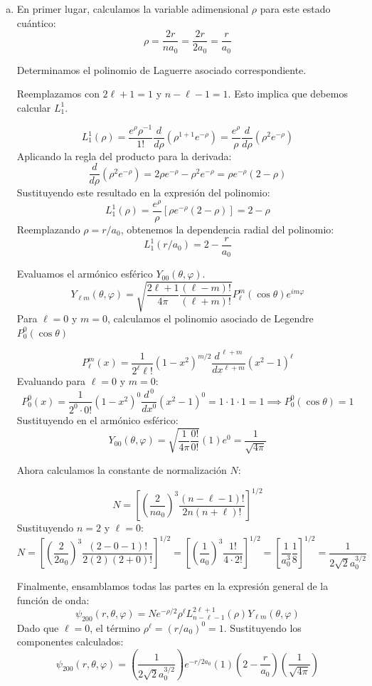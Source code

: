 \documentclass[a4paper]{article}
\begin{document}
\begin{enumerate}[a)]
	\item 
	
	En primer lugar, calculamos la variable adimensional $\rho$ para este estado cuántico:
$$ \rho = \frac{2r}{na_0} = \frac{2r}{2a_0} = \frac{r}{a_0} $$

Determinamos el polinomio de Laguerre asociado correspondiente. 

Reemplazamos con $2\ell+1 = 1$ y $n-\ell -1 = 1$. Esto implica que debemos calcular $L_1^1$.

$$ L_1^1(\rho) = \frac{e^\rho \rho^{-1}}{1!} \frac{d}{d\rho} \left( \rho^{1+1} e^{-\rho} \right) = \frac{e^\rho}{\rho} \frac{d}{d\rho} \left( \rho^2 e^{-\rho} \right) $$
Aplicando la regla del producto para la derivada:
$$ \frac{d}{d\rho} \left( \rho^2 e^{-\rho} \right) = 2\rho e^{-\rho} - \rho^2 e^{-\rho} = \rho e^{-\rho} (2 - \rho) $$
Sustituyendo este resultado en la expresión del polinomio:
$$ L_1^1(\rho) = \frac{e^\rho}{\rho} \left[ \rho e^{-\rho} (2 - \rho) \right] = 2 - \rho $$
Reemplazando $\rho = r/a_0$, obtenemos la dependencia radial del polinomio:
$$ L_1^1(r/a_0) = 2 - \frac{r}{a_0} $$

Evaluamos el armónico esférico $Y_{00}(\theta, \varphi)$. 
$$ Y_{\ell m}(\theta, \varphi) = \sqrt{\frac{2\ell+1}{4\pi} \frac{(\ell-m)!}{(\ell+m)!}} P_\ell^m(\cos\theta) e^{im\varphi} $$
Para $\ell=0$ y $m=0$, calculamos el polinomio asociado de Legendre $P_0^0(\cos\theta)$ 

$$ P_\ell^m(x) = \frac{1}{2^\ell \ell!} (1-x^2)^{m/2} \frac{d^{\,\ell+m}}{dx^{\ell+m}}(x^2 - 1)^\ell $$
Evaluando para $\ell=0$ y $m=0$:
$$ P_0^0(x) = \frac{1}{2^0 \cdot 0!} (1-x^2)^{0} \frac{d^{\,0}}{dx^{0}}(x^2 - 1)^0 = 1 \cdot 1 \cdot 1 = 1 \implies P_0^0(\cos\theta) = 1 $$
Sustituyendo en el armónico esférico:
$$ Y_{00}(\theta, \varphi) = \sqrt{\frac{1}{4\pi} \frac{0!}{0!}} (1) e^{0} = \frac{1}{\sqrt{4\pi}} $$

Ahora calculamos la constante de normalización $N$:

$$ N = \left[ \left(\frac{2}{na_0}\right)^3 \frac{(n-\ell-1)!}{2n(n+\ell)!} \right]^{1/2} $$
Sustituyendo $n=2$ y $\ell=0$:
$$ N = \left[ \left(\frac{2}{2a_0}\right)^3 \frac{(2-0-1)!}{2(2)(2+0)!} \right]^{1/2} = \left[ \left(\frac{1}{a_0}\right)^3 \frac{1!}{4 \cdot 2!} \right]^{1/2} = \left[ \frac{1}{a_0^3} \frac{1}{8} \right]^{1/2} = \frac{1}{2\sqrt{2} a_0^{3/2}} $$

Finalmente, ensamblamos todas las partes en la expresión general de la función de onda:
$$ \psi_{200}(r, \theta, \varphi) = N e^{-\rho/2} \rho^\ell L_{n-\ell-1}^{2\ell+1}(\rho) Y_{\ell m}(\theta, \varphi) $$
Dado que $\ell=0$, el término $\rho^\ell = (r/a_0)^0 = 1$. Sustituyendo los componentes calculados:
$$ \psi_{200}(r, \theta, \varphi) = \left( \frac{1}{2\sqrt{2} a_0^{3/2}} \right) e^{-r/2a_0} (1) \left( 2 - \frac{r}{a_0} \right) \left( \frac{1}{\sqrt{4\pi}} \right) $$


\end{enumerate}
\end{document}
